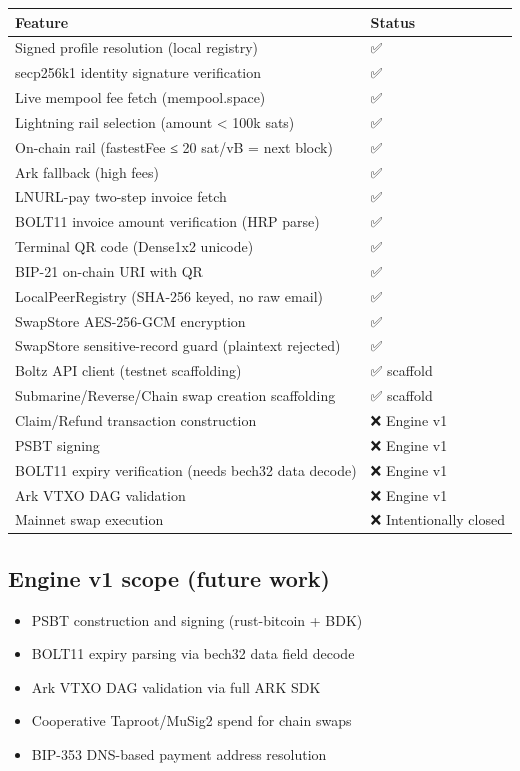 \documentclass[
]{article}
\providecommand{\tightlist}{%
  \setlength{\itemsep}{0pt}\setlength{\parskip}{0pt}}
\begin{document}
\begin{longtable}[]{@{}ll@{}}
\toprule\noalign{}
Feature & Status \\
\midrule\noalign{}
\endhead
\bottomrule\noalign{}
\endlastfoot
Signed profile resolution (local registry) & ✅ \\
secp256k1 identity signature verification & ✅ \\
Live mempool fee fetch (mempool.space) & ✅ \\
Lightning rail selection (amount \textless{} 100k sats) & ✅ \\
On-chain rail (fastestFee ≤ 20 sat/vB = next block) & ✅ \\
Ark fallback (high fees) & ✅ \\
LNURL-pay two-step invoice fetch & ✅ \\
BOLT11 invoice amount verification (HRP parse) & ✅ \\
Terminal QR code (Dense1x2 unicode) & ✅ \\
BIP-21 on-chain URI with QR & ✅ \\
LocalPeerRegistry (SHA-256 keyed, no raw email) & ✅ \\
SwapStore AES-256-GCM encryption & ✅ \\
SwapStore sensitive-record guard (plaintext rejected) & ✅ \\
Boltz API client (testnet scaffolding) & ✅ scaffold \\
Submarine/Reverse/Chain swap creation scaffolding & ✅ scaffold \\
Claim/Refund transaction construction & ❌ Engine v1 \\
PSBT signing & ❌ Engine v1 \\
BOLT11 expiry verification (needs bech32 data decode) & ❌ Engine v1 \\
Ark VTXO DAG validation & ❌ Engine v1 \\
Mainnet swap execution & ❌ Intentionally closed \\
\end{longtable}

\hypertarget{engine-v1-scope-future-work}{%
\subsection{Engine v1 scope (future
work)}\label{engine-v1-scope-future-work}}

\begin{itemize}
\tightlist
\item
  PSBT construction and signing (rust-bitcoin + BDK)
\item
  BOLT11 expiry parsing via bech32 data field decode
\item
  Ark VTXO DAG validation via full ARK SDK
\item
  Cooperative Taproot/MuSig2 spend for chain swaps
\item
  BIP-353 DNS-based payment address resolution
\end{itemize}
\end{document}
